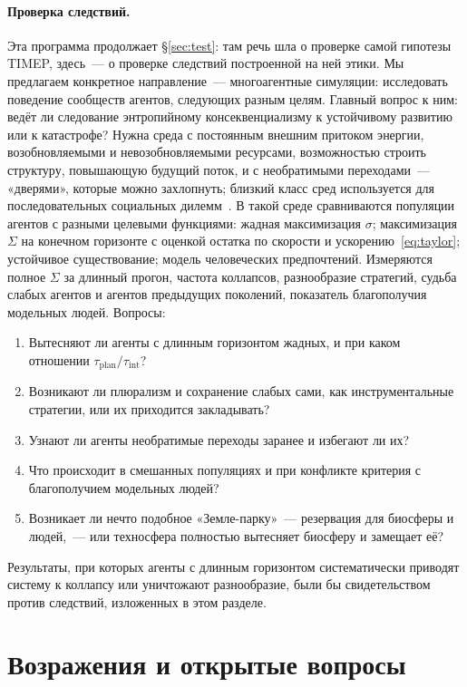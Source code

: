\documentclass[11pt,a4paper]{article}
\newcommand{\Sref}[1]{\hyperref[#1]{\S\ref{#1}}}
\begin{document}
\paragraph{Проверка следствий.}\label{sec:simulations}
Эта программа продолжает \Sref{sec:test}: там речь шла о проверке самой гипотезы TIMEP, здесь~--- о проверке следствий построенной на ней этики. Мы предлагаем конкретное направление~--- многоагентные симуляции: исследовать поведение сообществ агентов, следующих разным целям. Главный вопрос к ним: ведёт ли следование энтропийному консеквенциализму к устойчивому развитию или к катастрофе? Нужна среда с постоянным внешним притоком энергии, возобновляемыми и невозобновляемыми ресурсами, возможностью строить структуру, повышающую будущий поток, и с необратимыми переходами~--- «дверями», которые можно захлопнуть; близкий класс сред используется для последовательных социальных дилемм~\cite{leibo2017}. В такой среде сравниваются популяции агентов с разными целевыми функциями: жадная максимизация $\sigma$; максимизация $\Sigma$ на конечном горизонте с оценкой остатка по скорости и ускорению~\eqref{eq:taylor}; устойчивое существование; модель человеческих предпочтений. Измеряются полное $\Sigma$ за длинный прогон, частота коллапсов, разнообразие стратегий, судьба слабых агентов и агентов предыдущих поколений, показатель благополучия модельных людей. Вопросы:
\begin{enumerate}
\item Вытесняют ли агенты с длинным горизонтом жадных, и при каком отношении $\tau_{\mathrm{plan}}/\tau_{\mathrm{int}}$?
\item Возникают ли плюрализм и сохранение слабых сами, как инструментальные стратегии, или их приходится закладывать?
\item Узнают ли агенты необратимые переходы заранее и избегают ли их?
\item Что происходит в смешанных популяциях и при конфликте критерия с благополучием модельных людей?
\item Возникает ли нечто подобное «Земле-парку»~--- резервация для биосферы и людей,~--- или техносфера полностью вытесняет биосферу и замещает её?
\end{enumerate}
Результаты, при которых агенты с длинным горизонтом систематически приводят систему к коллапсу или уничтожают разнообразие, были бы свидетельством против следствий, изложенных в этом разделе.

\section{Возражения и открытые вопросы}\label{sec:limits}
\end{document}
